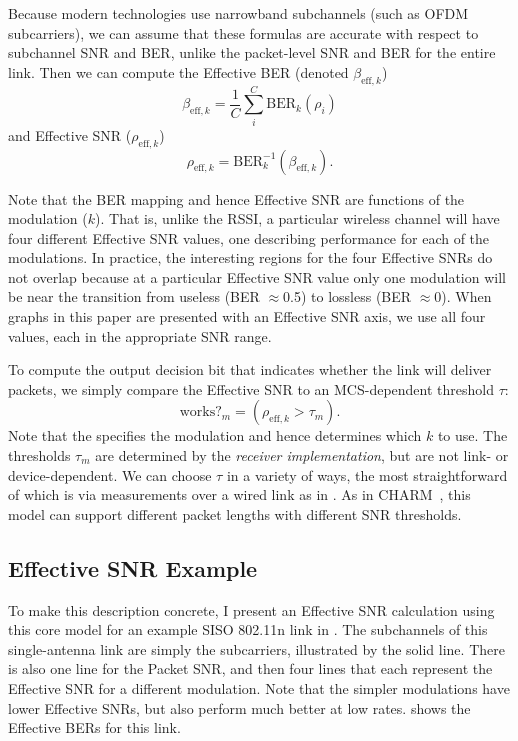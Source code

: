 Because modern technologies use narrowband subchannels (such as OFDM subcarriers), we can assume that these formulas are accurate with respect to subchannel SNR and BER, unlike the packet-level SNR and BER for the entire link. Then we can compute the Effective BER (denoted $\beta_{\text{eff},k}$)
\begin{equation}
	\label{eq:effective_ber}
	\beta_{\text{eff},k} = \frac{1}{C} \sum_{i}^{C} \text{BER}_k(\rho_i)
\end{equation}
and Effective SNR ($\rho_{\text{eff},k}$)
\begin{equation}
	\label{eq:effective_snr}
	\rho_{\text{eff},k} = \text{BER}_k^{-1}(\beta_{\text{eff},k}).
\end{equation}

Note that the BER mapping and hence Effective SNR are functions of the modulation ($k$). That is, unlike the RSSI, a particular wireless channel will have four different Effective SNR values, one describing performance for each of the modulations. In practice, the interesting regions for the four Effective SNRs do not overlap because at a particular Effective SNR value only one modulation will be near the transition from useless (BER $\approx$0.5) to lossless (BER $\approx$0). When graphs in this paper are presented with an Effective SNR axis, we use all four values, each in the appropriate SNR range.

To compute the output decision bit that indicates whether the link will deliver packets, we simply compare the Effective SNR to an MCS-dependent threshold $\tau$:
\begin{equation}
\text{works?}_m = (\rho_{\text{eff},k} > \tau_m).
\end{equation}
Note that the  specifies the modulation and hence determines which $k$ to use. The thresholds $\tau_m$ are determined by the \emph{receiver implementation}, but are not link- or device-dependent. We can choose $\tau$ in a variety of ways, the most straightforward of which is via measurements over a wired link as in . As in CHARM~\cite{Judd_CHARM}, this model can support different packet lengths with different SNR thresholds.

\subsection{Effective SNR Example}
To make this description concrete, I present an Effective SNR calculation using this core model for an example SISO 802.11n link in .  The subchannels of this single-antenna link are simply the subcarriers, illustrated by the solid line. There is also one line for the Packet SNR, and then four lines that each represent the Effective SNR for a different modulation. Note that the simpler modulations have lower Effective SNRs, but also perform much better at low rates.  shows the Effective BERs for this link.

